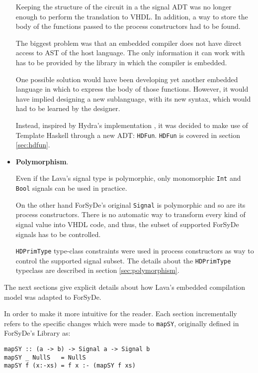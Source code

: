 \begin{itemize}
  Keeping the structure of the circuit in a the signal ADT was no
  longer enough to perform the translation to VHDL. In addition, a way
  to store the body of the functions passed to the process
  constructors had to be found.

  The biggest problem was that an embedded compiler does not have
  direct access to AST of the host language. The only information it
  can work with has to be provided by the library in which the
  compiler is embedded.

  One possible solution would have been developing yet another
  embedded language in which to express the body of those functions.
  However, it would have implied designing a new sublanguage, with
  its new syntax, which would had to be learned by the designer.
  
  Instead, inspired by Hydra's implementation \cite{hydra:th}, it was
  decided to make use of Template Haskell through a new ADT:
  \texttt{HDFun}. \texttt{HDFun} is covered in section \ref{sec:hdfun}.
  
  

\item \textbf{Polymorphism}. 

  Even if the Lava's signal type is polymorphic, only monomorphic
  \texttt{Int} and \texttt{Bool} signals can be used in practice.

  On the other hand ForSyDe's original \texttt{Signal} is polymorphic
  and so are its process constructors.  There is no automatic way to
  transform every kind of signal value into VHDL code, and thus, the
  subset of supported ForSyDe signals has to be controlled.
  
  \texttt{HDPrimType} type-class constraints were used in process
  constructors as way to control the supported signal subset. The
  details about the \texttt{HDPrimType} typeclass are described in
  section \ref{sec:polymorphism}.
  

\end{itemize}

The next sections give explicit details about how Lava's embedded
compilation model was adapted to ForSyDe.

In order to make it more intuitive for the reader. Each section
incrementally refers to the specific changes which were made to
\texttt{mapSY}, originally defined in ForSyDe's Library as:

  
\begin{lstlisting}
mapSY :: (a -> b) -> Signal a -> Signal b
mapSY _ NullS	= NullS
mapSY f (x:-xs)	= f x :- (mapSY f xs)
\end{lstlisting}

